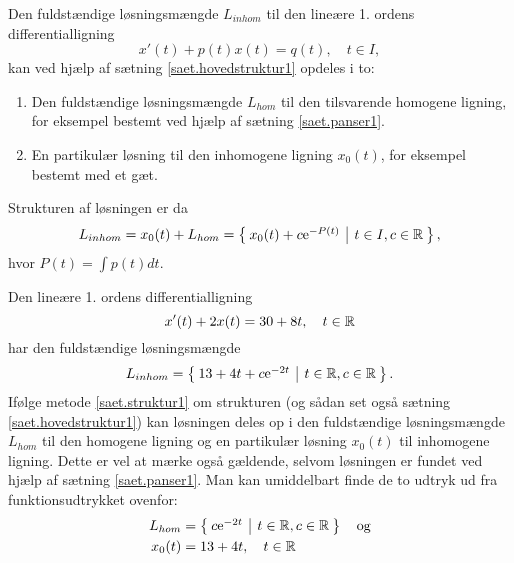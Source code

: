 \begin{method} \label{saet.struktur1}
Den fuldstændige løsningsmængde $ L_{inhom} $ til den lineære 1. ordens differentialligning
\begin{equation} 
x'(t) + p(t)x(t) = q(t), \quad t \in I, 
\end{equation}
kan ved hjælp af sætning \ref{saet.hovedstruktur1} opdeles i to:
\begin{enumerate}
\item Den fuldstændige løsningsmængde $ L_{hom} $ til den tilsvarende homogene ligning, for eksempel bestemt ved hjælp af sætning \ref{saet.panser1}.
\item En partikulær løsning til den inhomogene ligning $ x_0(t) $, for eksempel bestemt med et gæt.
\end{enumerate}
Strukturen af løsningen er da
\begin{equation}
L_{inhom} = x_0(t) + L_{hom} = \left\lbrace \hspace*{-1mm} \begin{array}{c|c} x_0(t) + c\mathrm{e}^{-P(t)} & t \in I, c \in \mathbb{R} \end{array} \hspace*{-1mm} \right\rbrace,
\end{equation}
hvor $ P(t) = \int p(t) dt $.
\end{method}

\begin{example} \label{eks.struktur21}
Den lineære 1. ordens differentialligning
\begin{equation}
x'(t) + 2x(t) = 30 + 8t, \quad t \in \mathbb{R}
\end{equation}
har den fuldstændige løsningsmængde
\begin{equation}
L_{inhom} = \left\lbrace \hspace*{-1mm} \begin{array}{c|c} 13 + 4t + c \mathrm{e}^{-2t} & t \in \mathbb{R}, c \in \mathbb{R} \end{array} \hspace*{-1mm} \right\rbrace.
\end{equation}
Ifølge metode \ref{saet.struktur1} om strukturen (og sådan set også sætning \ref{saet.hovedstruktur1}) kan løsningen deles op i den fuldstændige løsningsmængde $ L_{hom} $ til den homogene ligning og en partikulær løsning $ x_0(t) $ til inhomogene ligning. Dette er vel at mærke også gældende, selvom løsningen er fundet ved hjælp af sætning \ref{saet.panser1}. Man kan umiddelbart finde de to udtryk ud fra funktionsudtrykket ovenfor:
\begin{equation}
\begin{aligned}
L_{hom} &= \left\lbrace \hspace*{-1mm} \begin{array}{c|c} c \mathrm{e}^{-2t} & t \in \mathbb{R}, c \in \mathbb{R} \end{array} \hspace*{-1mm} \right\rbrace \quad \mathrm{og} \\
x_0(t) &= 13 + 4t, \quad t \in \mathbb{R}
\end{aligned}
\end{equation}
\end{example}

